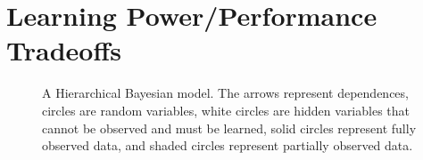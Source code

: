 \section{Learning Power/Performance Tradeoffs}
\begin{figure}
\centering
  \caption{ A Hierarchical Bayesian model.  The arrows represent dependences, circles
    are random variables, white circles are hidden variables that
    cannot be observed and must be learned, solid circles represent
    fully observed data, and shaded circles represent partially
    observed data.}
\label{fig:learning-models}
\end{figure}
